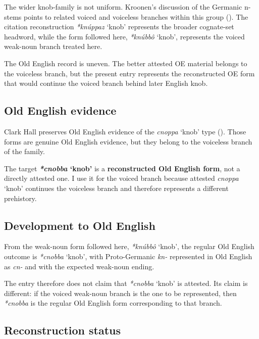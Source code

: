 \documentclass[
  british,
  a4paper,
  openany]{book}
\providecommand{\Recon}[1]{\emph{*#1}}
{\catcode`→=\active \global\def→{\ensuremath{\rightarrow}}}
\providecommand{\Recon}[1]{\emph{*#1}}
{\catcode`→=\active \global\def→{\ensuremath{\rightarrow}}}
\begin{document}
The wider knob-family is not uniform. Kroonen's discussion of the
Germanic n-stems points to related voiced and voiceless branches within
this group (). The citation
reconstruction \Recon{knúppaz} `knob' represents the broader cognate-set
headword, while the form followed here, \Recon{knúbbô} `knob',
represents the voiced weak-noun branch treated here.

The Old English record is uneven. The better attested OE material
belongs to the voiceless branch, but the present entry represents the
reconstructed OE form that would continue the voiced branch behind later
English knob.

\subsection{Old English evidence}\label{old-english-evidence-136}

Clark Hall preserves Old English evidence of the {\emph{cnoppa}} `knob'
type (). Those forms
are genuine Old English evidence, but they belong to the voiceless
branch of the family.

The target \textbf{\Recon{cnobba} `knob'} is a \textbf{reconstructed Old
English form}, not a directly attested one. I use it for the voiced
branch because attested {\emph{cnoppa}} `knob' continues the voiceless
branch and therefore represents a different prehistory.

\subsection{Development to Old
English}\label{development-to-old-english-136}

From the weak-noun form followed here, \Recon{knúbbô} `knob', the
regular Old English outcome is \Recon{cnobba} `knob', with
Proto-Germanic \emph{kn-} represented in Old English as \emph{cn-} and
with the expected weak-noun ending.

The entry therefore does not claim that \Recon{cnobba} `knob' is
attested. Its claim is different: if the voiced weak-noun branch is the
one to be represented, then \Recon{cnobba} is the regular Old English
form corresponding to that branch.

\subsection{Reconstruction status}\label{reconstruction-status}
\end{document}
